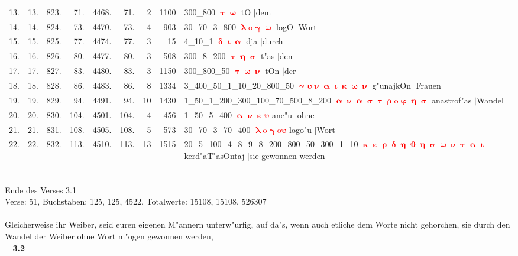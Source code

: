 \documentclass[a4paper,10pt,landscape]{article}
\begin{document}
\begin{tabular}{rrrrrrrrp{120mm}}
13.&13.&823.&71.&4468.&71.&2&1100&300\_800 \textcolor{red}{$\boldsymbol{\uptau\upomega}$} tO $|$dem\\
14.&14.&824.&73.&4470.&73.&4&903&30\_70\_3\_800 \textcolor{red}{$\boldsymbol{\uplambda\mathrm{o}\upgamma\upomega}$} logO $|$Wort\\
15.&15.&825.&77.&4474.&77.&3&15&4\_10\_1 \textcolor{red}{$\boldsymbol{\updelta\upiota\upalpha}$} dja $|$durch\\
16.&16.&826.&80.&4477.&80.&3&508&300\_8\_200 \textcolor{red}{$\boldsymbol{\uptau\upeta\upsigma}$} t"as $|$den\\
17.&17.&827.&83.&4480.&83.&3&1150&300\_800\_50 \textcolor{red}{$\boldsymbol{\uptau\upomega\upnu}$} tOn $|$der\\
18.&18.&828.&86.&4483.&86.&8&1334&3\_400\_50\_1\_10\_20\_800\_50 \textcolor{red}{$\boldsymbol{\upgamma\upsilon\upnu\upalpha\upiota\upkappa\upomega\upnu}$} g"unajkOn $|$Frauen\\
19.&19.&829.&94.&4491.&94.&10&1430&1\_50\_1\_200\_300\_100\_70\_500\_8\_200 \textcolor{red}{$\boldsymbol{\upalpha\upnu\upalpha\upsigma\uptau\uprho\mathrm{o}\upvarphi\upeta\upsigma}$} anastrof"as $|$Wandel\\
20.&20.&830.&104.&4501.&104.&4&456&1\_50\_5\_400 \textcolor{red}{$\boldsymbol{\upalpha\upnu\upepsilon\upsilon}$} ane"u $|$ohne\\
21.&21.&831.&108.&4505.&108.&5&573&30\_70\_3\_70\_400 \textcolor{red}{$\boldsymbol{\uplambda\mathrm{o}\upgamma\mathrm{o}\upsilon}$} logo"u $|$Wort\\
22.&22.&832.&113.&4510.&113.&13&1515&20\_5\_100\_4\_8\_9\_8\_200\_800\_50\_300\_1\_10 \textcolor{red}{$\boldsymbol{\upkappa\upepsilon\uprho\updelta\upeta\upvartheta\upeta\upsigma\upomega\upnu\uptau\upalpha\upiota}$} kerd"aT"asOntaj $|$sie gewonnen werden\\
\end{tabular}\medskip \\
Ende des Verses 3.1\\
Verse: 51, Buchstaben: 125, 125, 4522, Totalwerte: 15108, 15108, 526307\\
\\
Gleicherweise ihr Weiber, seid euren eigenen M"annern unterw"urfig, auf da"s, wenn auch etliche dem Worte nicht gehorchen, sie durch den Wandel der Weiber ohne Wort m"ogen gewonnen werden,\\
\newpage 
{\bf -- 3.2}\\
\medskip \\
\end{document}
